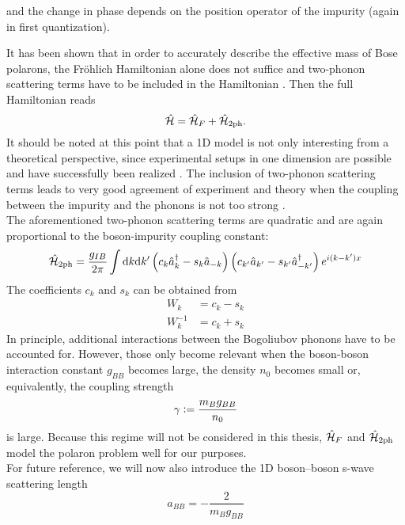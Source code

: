 and the change in phase depends on the position operator of the impurity (again in first quantization).\par
It has been shown that in order to accurately describe the effective mass of Bose polarons, the Fröhlich Hamiltonian alone does not suffice and two-phonon scattering terms have to be included in the Hamiltonian \cite{Grusdt_2017}. Then the full Hamiltonian reads
\begin{equation}\label{full_ham}
\hat{\mathcal{H}} = \hat{\mathcal{H}}_F + \hat{\mathcal{H}}_{2\mathrm{ph}}.
\end{equation}
It should be noted at this point that a 1D model is not only interesting from a theoretical perspective, since experimental setups in one dimension are possible and have successfully been realized \cite{Catani}. The inclusion of two-phonon scattering terms leads to very good agreement of experiment and theory when the coupling between the impurity and the phonons is not too strong \cite{Grusdt_2017}. \\
The aforementioned two-phonon scattering terms are quadratic and are again proportional to the boson-impurity coupling constant:
\begin{equation}
\hat{\mathcal{H}}_{2\mathrm{ph}}=\frac{g_{IB}}{2\pi}\int\mathrm d k\mathrm d k^\prime \left(c_k\hat a^\dagger_k-s_k\hat a_{-k}\right)\left(c_{k^\prime}\hat a_{k^\prime}-s_{k^\prime}\hat a^\dagger_{-k^\prime}\right)e^{i(k-k^\prime)x}
\end{equation}
The coefficients $c_k$ and $s_k$ can be obtained from 
\begin{subequations}
\begin{align}
W_k &= c_k - s_k\\
W_k^{-1} &= c_k + s_k
\end{align}
\end{subequations}
In principle, additional interactions between the Bogoliubov phonons have to be accounted for. However, those only become relevant when the boson-boson interaction constant $g_{BB}$ becomes large, the density $n_0$ becomes small or, equivalently, the coupling strength \begin{equation}\gamma\vcentcolon=\frac{m_B g_{BB}}{n_0}\end{equation} is large. Because this regime will not be considered in this thesis, $\hat{\mathcal{H}}_F$ and $\hat{\mathcal{H}}_{2\mathrm{ph}}$ model the polaron problem well for our purposes.\\
For future reference, we will now also introduce the 1D boson–boson s-wave scattering length 
\begin{equation}
a_{BB}=-\frac{2}{m_Bg_{BB}}
\end{equation}
